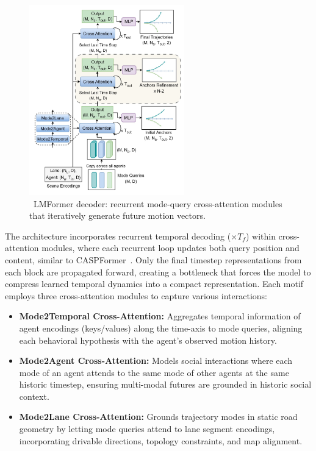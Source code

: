 \begin{figure}[ht]
  \centering
  \includegraphics[width=0.6\textwidth]{figures/lmformer_arch_decoder.png}
  \caption{\cite{lmformerYadav2025}~LMFormer decoder: recurrent mode-query cross-attention modules that iteratively generate future motion vectors.}
  \label{fig:lmformer_arch_decoder}
\end{figure}

The architecture incorporates recurrent temporal decoding (\(\times T_f\)) within cross-attention modules, where each recurrent loop updates both query position and content, similar to CASPFormer~\cite{caspformerYadav2024}. Only the final timestep representations from each block are propagated forward, creating a bottleneck that forces the model to compress learned temporal dynamics into a compact representation. Each motif employs three cross-attention modules to capture various interactions:
\begin{itemize}[leftmargin=*]
  \item \textbf{Mode2Temporal Cross-Attention:} Aggregates temporal information of agent encodings (keys/values) along the time-axis to mode queries, aligning each behavioral hypothesis with the agent's observed motion history.

  \item \textbf{Mode2Agent Cross-Attention:} Models social interactions where each mode of an agent attends to the same mode of other agents at the same historic timestep, ensuring multi-modal futures are grounded in historic social context.

  \item \textbf{Mode2Lane Cross-Attention:} Grounds trajectory modes in static road geometry by letting mode queries attend to lane segment encodings, incorporating drivable directions, topology constraints, and map alignment.
\end{itemize}

